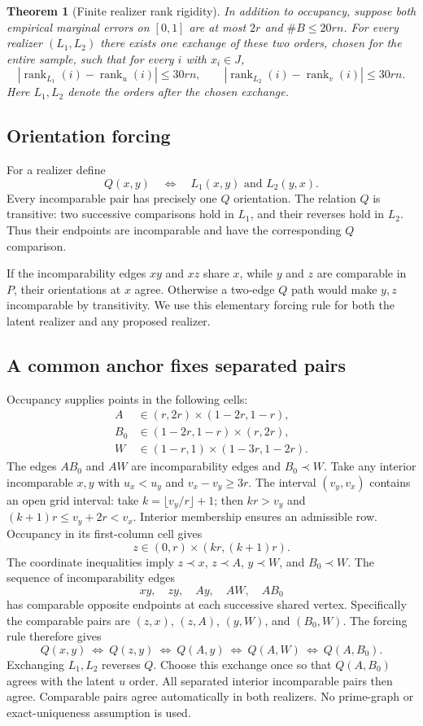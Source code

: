 \documentclass[11pt]{article}
\newtheorem{theorem}{Theorem}[section]
\theoremstyle{remark}
\newcommand{\rank}{\operatorname{rank}}
\begin{document}
\begin{theorem}[Finite realizer rank rigidity]\label{thm:finite}
In addition to occupancy, suppose both empirical marginal errors on
$[0,1]$ are at most $2r$ and $\#B\le20rn$. For every realizer
$(L_1,L_2)$ there exists one exchange of these two orders, chosen for
the entire sample, such that for every $i$ with $x_i\in J$,
\[
 |\rank_{L_1}(i)-\rank_u(i)|\le30rn,\qquad
 |\rank_{L_2}(i)-\rank_v(i)|\le30rn.
\]
Here $L_1,L_2$ denote the orders after the chosen exchange.
\end{theorem}

\subsection{Orientation forcing}
For a realizer define
\[
 Q(x,y)\quad\Longleftrightarrow\quad L_1(x,y)\text{ and }L_2(y,x).
\]
Every incomparable pair has precisely one $Q$ orientation. The relation
$Q$ is transitive: two successive comparisons hold in $L_1$, and their
reverses hold in $L_2$. Thus their endpoints are incomparable and
have the corresponding $Q$ comparison.

If the incomparability edges $xy$ and $xz$ share $x$, while $y$ and $z$
are comparable in $P$, their orientations at $x$ agree. Otherwise a
two-edge $Q$ path would make $y,z$ incomparable by transitivity.
We use this elementary forcing rule for both the latent realizer and
any proposed realizer.

\subsection{A common anchor fixes separated pairs}
Occupancy supplies points in the following cells:
\begin{align*}
 A&\in(r,2r)\times(1-2r,1-r),\\
 B_0&\in(1-2r,1-r)\times(r,2r),\\
 W&\in(1-r,1)\times(1-3r,1-2r).
\end{align*}
The edges $AB_0$ and $AW$ are incomparability edges and $B_0\prec W$.
Take any interior incomparable $x,y$ with
$u_x<u_y$ and $v_x-v_y\ge3r$.
The interval $(v_y,v_x)$ contains an open grid interval: take
$k=\lfloor v_y/r\rfloor+1$; then $kr>v_y$ and
$(k+1)r\le v_y+2r<v_x$. Interior membership ensures an admissible
row. Occupancy in its first-column cell gives
\[
 z\in(0,r)\times(kr,(k+1)r).
\]
The coordinate inequalities imply
$z\prec x$, $z\prec A$, $y\prec W$, and $B_0\prec W$.
The sequence of incomparability edges
\[
 xy,\quad zy,\quad Ay,\quad AW,\quad AB_0
\]
has comparable opposite endpoints at each successive shared vertex.
Specifically the comparable pairs are $(z,x)$, $(z,A)$, $(y,W)$,
and $(B_0,W)$. The forcing rule therefore gives
\[
 Q(x,y)\ \Longleftrightarrow\ Q(z,y)
 \ \Longleftrightarrow\ Q(A,y)
 \ \Longleftrightarrow\ Q(A,W)
 \ \Longleftrightarrow\ Q(A,B_0).
\]
Exchanging $L_1,L_2$ reverses $Q$. Choose this exchange once so that
$Q(A,B_0)$ agrees with the latent $u$ order. All separated interior
incomparable pairs then agree. Comparable pairs agree automatically
in both realizers. No prime-graph or exact-uniqueness assumption is used.
\end{document}
